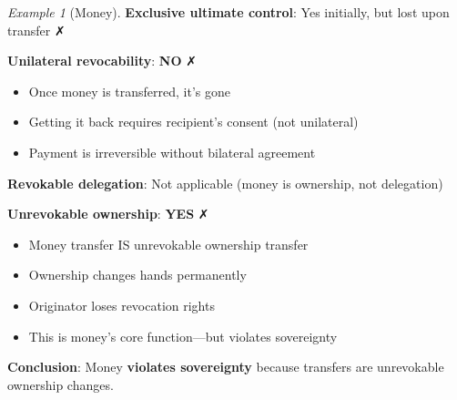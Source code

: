 \documentclass[11pt,a4paper]{article}
\theoremstyle{definition}
\theoremstyle{remark}
\newtheorem{example}[theorem]{Example}
\begin{document}
\begin{example}[Money]
\textbf{Exclusive ultimate control}: Yes initially, but lost upon transfer ✗

\textbf{Unilateral revocability}: \textbf{NO} ✗
\begin{itemize}
\item Once money is transferred, it's gone
\item Getting it back requires recipient's consent (not unilateral)
\item Payment is irreversible without bilateral agreement
\end{itemize}

\textbf{Revokable delegation}: Not applicable (money is ownership, not delegation)

\textbf{Unrevokable ownership}: \textbf{YES} ✗
\begin{itemize}
\item Money transfer IS unrevokable ownership transfer
\item Ownership changes hands permanently
\item Originator loses revocation rights
\item This is money's core function—but violates sovereignty
\end{itemize}

\textbf{Conclusion}: Money \textbf{violates sovereignty} because transfers are unrevokable ownership changes.
\end{example}
\end{document}
